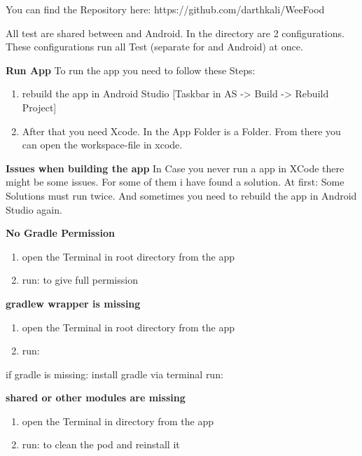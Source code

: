 You can find the Repository here: https://github.com/darthkali/WeeFood

All test are shared between \ios and Android. In the  directory are 2 configurations. These
configurations run all Test (separate for \ios and Android) at once.

\textbf{Run \ios App}\newline
To run the \ios app you need to follow these Steps:

\begin{enumerate}
    \item rebuild the app in Android Studio [Taskbar in AS -> Build -> Rebuild Project]
    \item After that you need Xcode. In the App Folder is a  Folder. From there you can open the workspace-file in xcode.
\end{enumerate}


\textbf{Issues when building the \ios app}\newline
In Case you never run a app in XCode there might be some issues. For some of them i have found a solution. At first: Some Solutions must run twice. And sometimes you need to rebuild the app in Android Studio again.

\textbf{No Gradle Permission}
\begin{enumerate}
    \item open the Terminal in root directory from the app
    \item run:  to give full permission
\end{enumerate}


\textbf{gradlew wrapper is missing}
\begin{enumerate}
    \item open the Terminal in root directory from the app
    \item run: 
\end{enumerate}
if gradle is missing: install gradle via terminal run: 

\textbf{shared or other modules are missing}
\begin{enumerate}
     \item open the Terminal in  directory from the app
     \item run:  to clean the pod and reinstall it
\end{enumerate}


